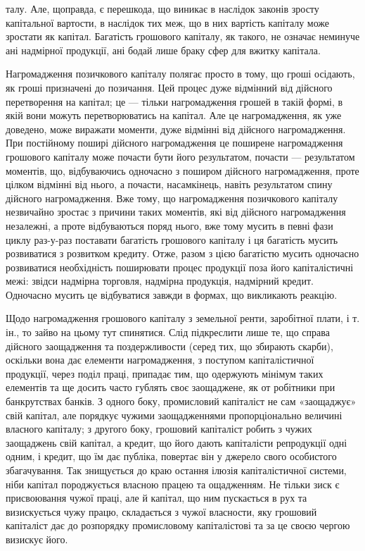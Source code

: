 талу. Але, щоправда, є перешкода, що виникає в наслідок законів зросту капітальної
вартости, в наслідок тих меж, що в них вартість капіталу може зростати
як капітал. Багатість грошового капіталу, як такого, не означає неминуче ані
надмірної продукції, ані бодай лише браку сфер для вжитку капітала.

Нагромадження позичкового капіталу полягає просто в тому, що гроші
осідають, як гроші призначені до позичання. Цей процес дуже відмінний від
дійсного перетворення на капітал; це — тільки нагромадження грошей в такій
формі, в якій вони можуть перетворюватись на капітал. Але це нагромадження,
як уже доведено, може виражати моменти, дуже відмінні від дійсного нагромадження.
При постійному поширі дійсного нагромадження це поширене нагромадження
грошового капіталу може почасти бути його результатом, почасти —
результатом моментів, що, відбуваючись одночасно з поширом дійсного нагромадження,
проте цілком відмінні від нього, а почасти, насамкінець, навіть результатом
спину дійсного нагромадження. Вже тому, що нагромадження позичкового
капіталу незвичайно зростає з причини таких моментів, які від дійсного
нагромадження незалежні, а проте відбуваються поряд нього, вже тому мусить
в певні фази циклу раз-у-раз поставати багатість грошового капіталу і ця
багатість мусить розвиватися з розвитком кредиту. Отже, разом з цією багатістю
мусить одночасно розвиватися необхідність поширювати процес продукції поза його
капіталістичні межі: звідси надмірна торговля, надмірна продукція, надмірний
кредит. Одночасно мусить це відбуватися завжди в формах, що викликають
реакцію.

Щодо нагромадження грошового капіталу з земельної ренти, заробітної плати,
і т. ін., то зайво на цьому тут спинятися. Слід підкреслити лише те, що справа
дійсного заощадження та поздержливости (серед тих, що збирають скарби), оскільки
вона дає елементи нагромадження, з поступом капіталістичної продукції, через поділ
праці, припадає тим, що одержують мінімум таких елементів та ще досить часто
гублять своє заощаджене, як от робітники при банкрутствах банків. З одного
боку, промисловий капіталіст не сам «заощаджує» свій капітал, але порядкує чужими
заощадженнями пропорціонально величині власного капіталу; з другого боку,
грошовий капіталіст робить з чужих заощаджень свій капітал, а кредит, що його
дають капіталісти репродукції одні одним, і кредит, що їм дає публіка, повертає
він у джерело свого особистого збагачування. Так знищується до краю остання
ілюзія капіталістичної системи, ніби капітал породжується власною працею та ощадженням.
Не тільки зиск є присвоювання чужої праці, але й капітал, що ним
пускається в рух та визискується чужу працю, складається з чужої власности,
яку грошовий капіталіст дає до розпорядку промисловому капіталістові та за
це своєю чергою визискує його.

